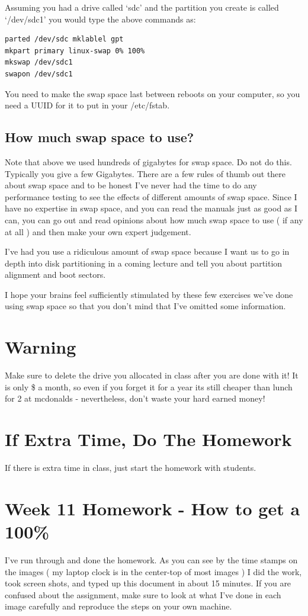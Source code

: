 \documentclass[10pt]{article}
\begin{document}
Assuming you had a drive called `sdc' and the partition you create is called
`/dev/sdc1' you would type the above commands as:

\begin{lstlisting}
parted /dev/sdc mklablel gpt
mkpart primary linux-swap 0% 100%
mkswap /dev/sdc1
swapon /dev/sdc1
\end{lstlisting}

You need to make the swap space last between reboots on your computer, so you
need a UUID for it to put in your /etc/fstab.


\subsection{How much swap space to use?} 

Note that above we used hundreds of
gigabytes for swap space. Do not do this. Typically you give a few Gigabytes.
There are a few rules of thumb out there about swap space and to be honest I've
never had the time to do any performance testing to see the effects of different
amounts of swap space. Since I have no expertise in swap space, and you can read
the manuals just as good as I can, you can go out and read opinions about how
much swap space to use ( if any at all ) and then make your own expert
judgement.


I've had you use a ridiculous amount of swap space because I want us to go in
depth into disk partitioning in a coming lecture and tell you about partition
alignment and boot sectors. 

I hope your brains feel sufficiently stimulated by these few exercises we've
done using swap space so that you don't mind that I've omitted some information.

\section{Warning}
Make sure to delete the drive you allocated in class after you are done with it!
It is only \$ a month, so even if you forget it for a year its still cheaper
than lunch for 2 at mcdonalds - nevertheless, don't waste your hard earned
money!

\section{If Extra Time, Do The Homework}
 If there is extra time in class, just
start the homework with students.


\section{Week 11 Homework - How to get a 100\%}
I've run through and done the homework. As you can see by the time stamps on the
images ( my laptop clock is in the center-top of most images ) I did the work,
took screen shots, and typed up this document in about 15 minutes. If you are
confused about the assignment, make sure to look at what I've done in each image
carefully and reproduce the steps on your own machine.
\end{document}
